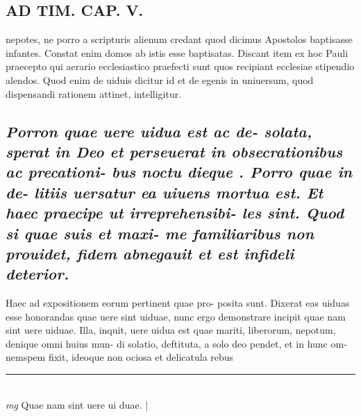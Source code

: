 \documentclass{article}
\begin{document}
\begin{pages}
\section*{AD TIM. CAP. V. }
\marginpar{[ p.150 ]}\pstart nepotes, ne porro a scripturis alienum credant quod dicimus Apostolos baptisasse infantes. Constat enim domos ab istis esse baptisatas. Discant item ex hoc Pauli praecepto qui aerario ecclesiastico praefecti sunt quos recipiant ecclesiae stipendio alendos. Quod enim de uiduis dicitur id et de egenis in uniuersum, quod dispensandi rationem attinet, intelligitur.  \pend
{}
{}
\subsection*{\textit{Porron quae uere uidua est ac de- solata, sperat in Deo et perseuerat in obsecrationibus ac precationi- bus noctu dieque . Porro quae in de- litiis uersatur ea uiuens mortua est. Et haec praecipe ut irreprehensibi- les sint. Quod si quae suis et maxi- me familiaribus non prouidet, fidem abnegauit et est infideli deterior. }}\pstart Haec ad expositionem eorum pertinent quae pro- posita sunt. Dixerat eas uiduas esse honorandas quae uere sint uiduae, nunc ergo demonstrare incipit quae nam sint uere uiduae. Illa, inquit, uere uidua est quae mariti, liberorum, nepotum, denique omni huius mun- di solatio, deftituta, a solo deo pendet, et in hunc om- nemspem fixit, ideoque non ociosa et delicatula rebus  \pend
\vspace{0.5cm}\noindent
\vspace{0.2cm}\rule{1cm}{0.2pt}\\ 
\hspace{0.2cm}\textit{mg}
\footnotesize Quae nam sint uere ui duae. 
\normalsize| 

\end{pages}
\end{document}
